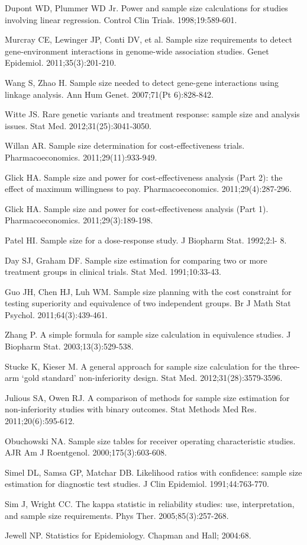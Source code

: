 \begin{references}
\item Dupont WD, Plummer WD Jr. Power and sample size calculations for studies involving linear regression. Control Clin Trials. 1998;19:589-601.
\item Murcray CE, Lewinger JP, Conti DV, et al. Sample size requirements to detect gene-environment interactions in genome-wide association studies. Genet Epidemiol. 2011;35(3):201-210.
\item Wang S, Zhao H. Sample size needed to detect gene-gene interactions using linkage analysis. Ann Hum Genet. 2007;71(Pt 6):828-842.
\item Witte JS. Rare genetic variants and treatment response: sample size and analysis issues. Stat Med. 2012;31(25):3041-3050.
\item Willan AR. Sample size determination for cost-effectiveness trials. Pharmacoeconomics. 2011;29(11):933-949.
\item Glick HA. Sample size and power for cost-effectiveness analysis (Part 2): the effect of maximum willingness to pay. Pharmacoeconomics. 2011;29(4):287-296.
\item Glick HA. Sample size and power for cost-effectiveness analysis (Part 1). Pharmacoeconomics. 2011;29(3):189-198.
\item Patel HI. Sample size for a dose-response study. J Biopharm Stat. 1992;2:l- 8.
\item Day SJ, Graham DF. Sample size estimation for comparing two or more treatment groups in clinical trials. Stat Med. 1991;10:33-43.
\item Guo JH, Chen HJ, Luh WM. Sample size planning with the cost constraint for testing superiority and equivalence of two independent groups. Br J Math Stat Psychol. 2011;64(3):439-461.
\item Zhang P. A simple formula for sample size calculation in equivalence studies. J Biopharm Stat. 2003;13(3):529-538.
\item Stucke K, Kieser M. A general approach for sample size calculation for the three-arm ‘gold standard’ non-inferiority design. Stat Med. 2012;31(28):3579-3596.
\item Julious SA, Owen RJ. A comparison of methods for sample size estimation for non-inferiority studies with binary outcomes. Stat Methods Med Res. 2011;20(6):595-612.
\item Obuchowski NA. Sample size tables for receiver operating characteristic studies. AJR Am J Roentgenol. 2000;175(3):603-608.
\item Simel DL, Samsa GP, Matchar DB. Likelihood ratios with confidence: sample size estimation for diagnostic test studies. J Clin Epidemiol. 1991;44:763-770.
\item Sim J, Wright CC. The kappa statistic in reliability studies: use, interpretation, and sample size requirements. Phys Ther. 2005;85(3):257-268.
\item Jewell NP. Statistics for Epidemiology. Chapman and Hall; 2004:68.
\end{references}
